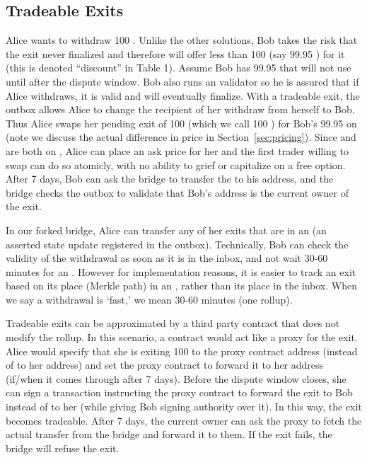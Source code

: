  

\subsection{Tradeable Exits} 
\label{sec:tradeablexits}

Alice wants to withdraw 100 \ethtwo. Unlike the other solutions, Bob takes the risk that the exit never finalized and therefore will offer less than 100 \ethone (say 99.95 \ethone) for it (this is denoted ``discount'' in Table 1). Assume Bob has 99.95 \ethone that will not use until after the dispute window. Bob also runs an \layertwo validator so he is assured that if Alice withdraws, it is valid and will eventually finalize. With a tradeable exit, the outbox allows Alice to change the recipient of her withdraw from herself to Bob. Thus Alice swaps her pending exit of 100 \ethone (which we call 100 \ethxx) for Bob's 99.95 \ethone on \layerone (note we discuss the actual difference in price in Section~\ref{sec:pricing}). Since \ethone and \ethxx are both on \layerone, Alice can place an ask price for her \ethxx and the first trader willing to swap can do so atomicly, with no ability to grief or capitalize on a free option. After 7 days, Bob can ask the bridge to transfer the \ethone to his address, and the bridge checks the outbox to validate that Bob's address is the current owner of the exit.

In our forked bridge, Alice can transfer any of her exits that are in an \rblock (\ie an asserted \layertwo state update registered in the outbox). Technically, Bob can check the validity of the withdrawal as soon as it is in the inbox, and not wait 30-60 minutes for an \rblock. However for implementation reasons, it is easier to track an exit based on its place (\ie Merkle path) in an \rblock, rather than its place in the inbox. When we say a withdrawal is `fast,' we mean 30-60 minutes (\ie one \layertwo rollup).

Tradeable exits can be approximated by a third party \layerone contract that does not modify the rollup. In this scenario, a \layerone contract would act like a proxy for the exit. Alice would specify that she is exiting 100 \ethtwo to the proxy contract address (instead of to her address) and set the proxy contract to forward it to her address (if/when it comes through after 7 days). Before the dispute window closes, she can sign a transaction instructing the proxy contract to forward the exit to Bob instead of to her (while giving Bob signing authority over it). In this way, the exit becomes tradeable. After 7 days, the current owner can ask the proxy to fetch the actual transfer from the bridge and forward it to them. If the exit fails, the bridge will refuse the exit. 

